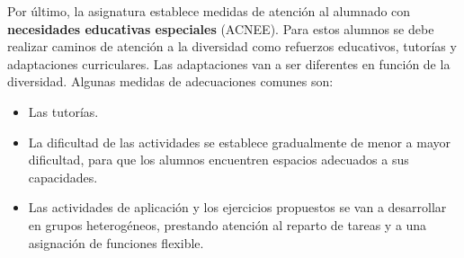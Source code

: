 \documentclass[spanish,12pt, a4paper,twoside]{paper}
\begin{document}
\justify
Por último, la asignatura establece medidas de atención al alumnado con \textbf{necesidades educativas especiales} (ACNEE). Para estos alumnos se debe realizar caminos de atención a la diversidad como refuerzos educativos, tutorías y adaptaciones curriculares. Las adaptaciones van a ser diferentes en función de la diversidad. Algunas medidas de adecuaciones comunes son:
\begin{itemize}
\item Las tutorías.
\item La dificultad de las actividades se establece gradualmente de menor a mayor dificultad, para que los alumnos encuentren espacios adecuados a sus capacidades.
\item Las actividades de aplicación y los ejercicios propuestos se van a desarrollar en grupos heterogéneos, prestando atención al reparto de tareas y a una asignación de funciones flexible.
\end{itemize}
\end{document}
